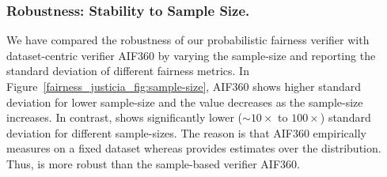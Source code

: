 \subsubsection{Robustness: Stability to Sample Size.} 
We have compared the robustness of our probabilistic fairness verifier {\justicia} with dataset-centric verifier AIF360 by varying the sample-size and reporting the standard deviation of different fairness metrics. 
In Figure~\ref{fairness_justicia_fig:sample-size}, AIF360 shows higher standard deviation for lower sample-size and the value decreases as  the sample-size increases. 
In contrast, {\justicia} shows significantly lower ($\sim10\times$ to $100\times$) standard deviation for different sample-sizes. 
The reason is that AIF360 empirically measures on a fixed dataset whereas {\justicia} provides estimates over the distribution.
Thus, {\justicia} is more robust than the sample-based verifier AIF360.

